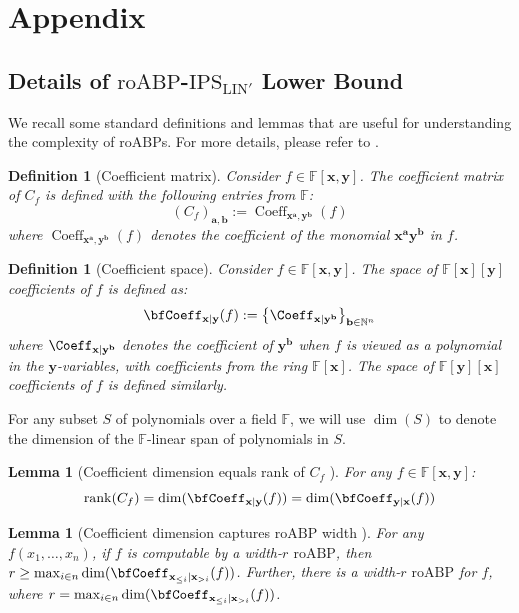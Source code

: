 \documentclass[11pt]{article}
\newtheorem{lemma}[theorem]{Lemma}
\newtheorem{definition}[theorem]{Definition}
\newcommand{\F}{\mathbb{F}}
\newcommand{\IPSLINp}{\mathrm{IPS}_{\mathrm{LIN}'}}
\newcommand{\roABP}{\mathrm{roABP}}
\begin{document}
\section{Appendix}
\subsection{Details of $\roABP$-$\IPSLINp$ Lower Bound}

We recall some standard definitions and lemmas that are useful for understanding the complexity of $\roABP$s. For more details, please refer to \cite{FSTW21,Forbes-thesis}.
\begin{definition}[Coefficient matrix]
    Consider $f \in \F[\mathbf{x},\mathbf{y}]$. The coefficient matrix of $C_f$ is defined with the following entries from $\F$: 
    $$(C_f)_{\mathbf{a},\mathbf{b}} := \operatorname{Coeff}_{\mathbf{x}^{\mathbf{a}},\mathbf{y}^{\mathbf{b}}}(f)$$
    where $\operatorname{Coeff}_{\mathbf{x}^{\mathbf{a}},\mathbf{y}^{\mathbf{b}}}(f)$ denotes the coefficient of the monomial $\mathbf{x}^{\mathbf{a}}\mathbf{y}^{\mathbf{b}}$ in $f$. 
\end{definition}

\begin{definition}[Coefficient space]
    Consider $f \in \F[\mathbf{x},\mathbf{y}]$. The \emph{space of $\F[\mathbf{x}][\mathbf{y}]$ coefficients of $f$} is defined as: $$ \bfCoeff_{\mathbf{x}|\mathbf{y}}(f) := \left\{ \Coeff_{\mathbf{x}|\mathbf{y}^{\mathbf{b}}} \right\}_{\mathbf{b}\in \mathbb{N}^{n}}$$ where $\Coeff_{\mathbf{x}|\mathbf{y}^{\mathbf{b}}}$ denotes the coefficient of $\mathbf{y}^{\mathbf{b}}$ when $f$ is viewed as a polynomial in the $\mathbf{y}$-variables, with coefficients from the ring $\F[\mathbf{x}]$. The \emph{space of $\F[\mathbf{y}][\mathbf{x}]$ coefficients of $f$} is defined similarly.
\end{definition}

For any subset $S$ of polynomials over a field $\F$, we will use $\dim(S)$ to denote the dimension of the $\F$-linear span of polynomials in $S$. 

\begin{lemma}[Coefficient dimension equals rank of $C_f$ \cite{Nisan}]
    For any $f \in \F[\mathbf{x},\mathbf{y}]$: $$ \operatorname{rank}(C_f) = \dim(\bfCoeff_{\mathbf{x}|\mathbf{y}}(f)) = \dim(\bfCoeff_{\mathbf{y}|\mathbf{x}}(f))$$
\end{lemma}

\begin{lemma}[Coefficient dimension captures $\roABP$ width \cite{Nisan}\cite{Forbes-thesis}]\label{lem: nisan roabp width}
    For any $f(x_1, \dots, x_n)$, if $f$ is computable by a width-$r$ $\roABP$, then $r \geq \max_{i\in n} \dim(\bfCoeff_{\mathbf{x}_{\leq i}|\mathbf{x}_{> i}}(f))$. Further, there is a width-$r$ $\roABP$ for $f$, where $r = \max_{i\in n} \dim(\bfCoeff_{\mathbf{x}_{\leq i}|\mathbf{x}_{> i}}(f))$.
\end{lemma}
\end{document}
